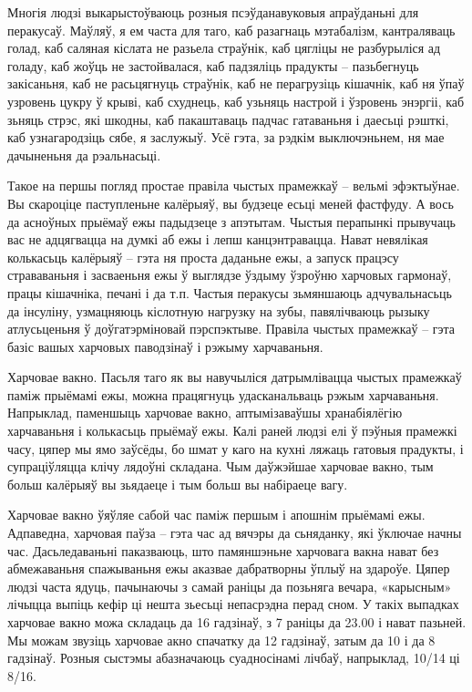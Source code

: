 Многія людзі выкарыстоўваюць розныя псэўданавуковыя апраўданьні для перакусаў. Маўляў, я ем часта для таго, каб разагнаць мэтабалізм, кантраляваць голад, каб саляная кіслата не разьела страўнік, каб цягліцы не разбурыліся ад голаду, каб жоўць не застойвалася, каб падзяліць прадукты – пазьбегнуць закісаньня, каб не расьцягнуць страўнік, каб не перагрузіць кішачнік, каб ня ўпаў узровень цукру ў крыві, каб схуднець, каб узьняць настрой і ўзровень энэргіі, каб зьняць стрэс, які шкодны, каб пакаштаваць падчас гатаваньня і даесьці рэшткі, каб узнагародзіць сябе, я заслужыў. Усё гэта, за рэдкім выключэньнем, ня мае дачыненьня да рэальнасьці.

Такое на першы погляд простае правіла чыстых прамежкаў – вельмі эфэктыўнае. Вы скароціце паступленьне калёрыяў, вы будзеце есьці меней фастфуду. А вось да асноўных прыёмаў ежы падыдзеце з апэтытам. Чыстыя перапынкі прывучаць вас не адцягвацца на думкі аб ежы і лепш канцэнтравацца. Нават невялікая колькасьць калёрыяў – гэта ня проста даданьне ежы, а запуск працэсу страваваньня і засваеньня ежы ў выглядзе ўздыму ўзроўню харчовых гармонаў, працы кішачніка, печані і да т.п. Частыя перакусы зьмяншаюць адчувальнасьць да інсуліну, узмацняюць кіслотную нагрузку на зубы, павялічваюць рызыку атлусьценьня ў доўгатэрміновай пэрспэктыве. Правіла чыстых прамежкаў – гэта базіс вашых харчовых паводзінаў і рэжыму харчаваньня.

Харчовае вакно. Пасьля таго як вы навучыліся датрымлівацца чыстых прамежкаў паміж прыёмамі ежы, можна працягнуць удасканальваць рэжым харчаваньня. Напрыклад, паменшыць харчовае вакно, аптымізаваўшы хранабіялёгію харчаваньня і колькасьць прыёмаў ежы. Калі раней людзі елі ў пэўныя прамежкі часу, цяпер мы ямо заўсёды, бо шмат у каго на кухні ляжаць гатовыя прадукты, і супраціўляцца клічу лядоўні складана. Чым даўжэйшае харчовае вакно, тым больш калёрыяў вы зьядаеце і тым больш вы набіраеце вагу.

Харчовае вакно ўяўляе сабой час паміж першым і апошнім прыёмамі ежы. Адпаведна, харчовая паўза – гэта час ад вячэры да сьняданку, які ўключае начны час. Дасьледаваньні паказваюць, што памяншэньне харчовага вакна нават без абмежаваньня спажываньня ежы аказвае дабратворны ўплыў на здароўе. Цяпер людзі часта ядуць, пачынаючы з самай раніцы да позьняга вечара, «карысным» лічыцца выпіць кефір ці нешта зьесьці непасрэдна перад сном. У такіх выпадках харчовае вакно можа складаць да 16 гадзінаў, з 7 раніцы да 23.00 і нават пазьней. Мы можам звузіць харчовае акно спачатку да 12 гадзінаў, затым да 10 і да 8 гадзінаў. Розныя сыстэмы абазначаюць суадносінамі лічбаў, напрыклад, 10/14 ці 8/16.

